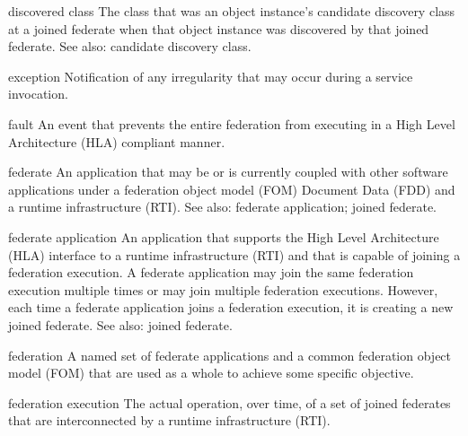 
\begin{definition}{discovered class}
    The class that was an object instance's candidate discovery class at a joined federate when that object instance was discovered by that joined federate. See also: candidate discovery class.
\end{definition}


\begin{definition}{exception}
    Notification of any irregularity that may occur during a service invocation.
\end{definition}

\begin{definition}{fault}
    An event that prevents the entire federation from executing in a High Level Architecture (HLA) compliant manner.
\end{definition}

\begin{definition}{federate}
    An application that may be or is currently coupled with other software applications under a federation object model (FOM) Document Data (FDD) and a runtime infrastructure (RTI). See also: federate application; joined federate.
\end{definition}

\begin{definition}{federate application}
    An application that supports the High Level Architecture (HLA) interface to a runtime infrastructure (RTI) and that is capable of joining a federation execution. A federate application may join the same federation execution multiple times or may join multiple federation executions. However, each time a federate application joins a federation execution, it is creating a new joined federate. See also: joined federate.
\end{definition}

\begin{definition}{federation}
    A named set of federate applications and a common federation object model (FOM) that are used as a whole to achieve some specific objective.
\end{definition}

\begin{definition}{federation execution}
    The actual operation, over time, of a set of joined federates that are interconnected by a runtime infrastructure (RTI).
\end{definition}

